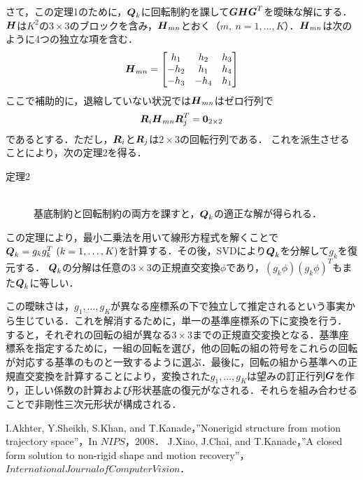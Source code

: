 \documentclass[a4paper,10pt]{jarticle}
\begin{document}
さて，この定理1のために，$ \mbox{\boldmath $ Q $}_k $に回転制約を課して$ \mbox{\boldmath $ G $} \mbox{\boldmath $ H $} \mbox{\boldmath $ G $}^T $を曖昧な解にする．$ \mbox{\boldmath $ H $} $は$ K^2 $の$ 3 \times 3 $のブロックを含み，$ \mbox{\boldmath $ H $}_{mn} $とおく（$ m,~n =1, \dots ,K $）．$ \mbox{\boldmath $ H $}_{mn} $は次のように4つの独立な項を含む．
%
\begin{equation}
 \mbox{\boldmath $ H $}_{mn} =
 \begin{bmatrix}
  h_1 & h_2 & h_3 \\
  -h_2& h_1 & h_4 \\
  -h_3& -h_4 & h_1
 \end{bmatrix}
\end{equation}
%
ここで補助的に，退縮していない状況では$ \mbox{\boldmath $ H $}_{mn} $はゼロ行列で
%
\begin{equation}
 \mbox{\boldmath $ R $}_i \mbox{\boldmath $ H $}_{mn} \mbox{\boldmath $ R $}^T_j = \mbox{\boldmath $ 0 $}_{2 \times 2}
\end{equation}
%
であるとする．ただし，$ \mbox{\boldmath $ R $}_i $と$ \mbox{\boldmath $ R $}_j $は$ 2 \times 3 $の回転行列である．
これを派生させることにより，次の定理2を得る．
%
\begin{description}
 \item[定理2]\mbox{}\\
   基底制約と回転制約の両方を課すと，$ \mbox{\boldmath $ Q $}_k $の適正な解が得られる．
\end{description}
%
この定理により，最小二乗法を用いて線形方程式を解くことで$ \mbox{\boldmath $ Q $}_k = g_k g^T_k ~ (k = 1, \dots , K) $を計算する．その後，SVDにより$ \mbox{\boldmath $ Q $}_k $を分解して$ g_k $を復元する．
$ \mbox{\boldmath $ Q $}_k $の分解は任意の$ 3 \times 3 $の正規直交変換$ \phi $であり，$ (g_k \phi)(g_k \phi)^T $もまた$ \mbox{\boldmath $ Q $}_k $に等しい．

この曖昧さは，$ g_1 , \dots , g_K $が異なる座標系の下で独立して推定されるという事実から生じている．これを解消するために，単一の基準座標系の下に変換を行う．
すると，それぞれの回転の組が異なる$ 3 \times 3 $までの正規直交変換となる．基準座標系を指定するために，一組の回転を選び，他の回転の組の符号をこれらの回転が対応する基準のものと一致するように選ぶ．最後に，回転の組から基準への正規直交変換を計算することにより，変換された$ g_1, \dots , g_K $は望みの訂正行列$ \mbox{\boldmath $ G $} $を作り，正しい係数の計算および形状基底の復元がなされる．それらを組み合わせることで非剛性三次元形状が構成される．


\begin{thebibliography}{99}
 I.Akhter, Y.Sheikh, S.Khan, and T.Kanade，”Nonerigid structure from motion trajectory space”，In $ NIPS $，2008．
 J.Xiao, J.Chai, and T.Kanade，”A closed form solution to non-rigid shape and motion recovery”，$International Journal of Computer Vision$．
\end{thebibliography}
\end{document}

